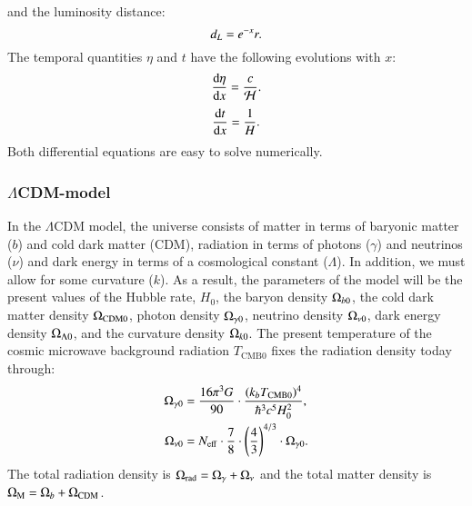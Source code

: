     and the luminosity distance:
    \begin{equation}\label{eq:m1:theory:measures:luminosity_distance}
        d_L = e^{-x}r.
    \end{equation}
    The temporal quantities $\eta$ and $t$ have the following evolutions with $x$:
    \begin{equation}\label{eq:m1:theory:measures:eta_diffeq}
        \dv{\eta}{x} = \frac{c}{\mathcal{H}}.
    \end{equation}
    \begin{equation}\label{eq:m1:theory:measures:t_diffeq}
        \dv{t}{x} = \frac{1}{H}.
    \end{equation}
    Both differential equations are easy to solve numerically.

\subsubsection{$\Lambda$CDM-model}\label{sec:m1:lambdaCDM}

    In the $\Lambda$CDM model, the universe consists of matter in terms of baryonic matter ($b$) and cold dark matter (CDM), radiation in terms of photons ($\gamma$) and neutrinos ($\nu$) and dark energy in terms of a cosmological constant ($\Lambda$). In addition, we must allow for some curvature ($k$). As a result, the parameters of the model will be the present values of the Hubble rate, $H_0$, the baryon density $\Omega_{b0}$, the cold dark matter density $\Omega_{\mathrm{CDM}0}$, photon density $\Omega_{\gamma0}$, neutrino density $\Omega_{\nu0}$, dark energy density $\Omega_{\Lambda0}$, and the curvature density $\Omega_{k0}$. The present temperature of the cosmic microwave background radiation $T_{\mathrm{CMB}0}$ fixes the radiation density today through:
    \begin{equation}\label{eq:m1:theory:lambdaCDM:radiation_densities}
        \begin{split}
            \Omega_{\gamma0} &= \frac{16\pi^3G}{90}\cdot\frac{(k_b T_{\mathrm{CMB}0})^4}{\hbar^3c^5H_0^2}, \\
            \Omega_{\nu0} &= N_\mathrm{eff} \cdot\frac{7}{8} \cdot \left( \frac{4}{3} \right)^{4/3}\cdot \Omega_{\gamma0}.
        \end{split}
    \end{equation}
    The total radiation density is $\Omega_\mathrm{rad}=\Omega_\gamma+\Omega_\nu$ and the total matter density is $\Omega_\mathrm{M} = \Omega_b+\Omega_\mathrm{CDM}$.

